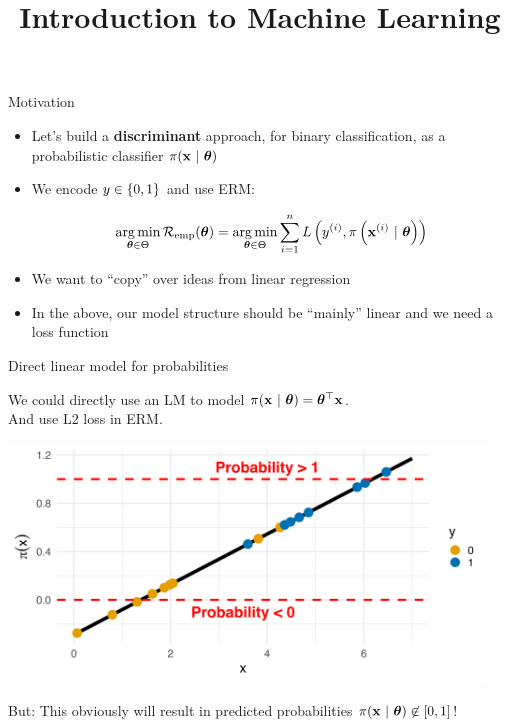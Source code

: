 \documentclass[11pt,compress,t,notes=noshow, xcolor=table]{beamer}
\title{Introduction to Machine Learning}
\begin{document}

\framebreak


\begin{vbframe}{Motivation}

\begin{itemize}

\item Let's build a \textbf{discriminant} approach, for binary classification, as a probabilistic classifier $\pi(\mathbf{x}~|~ \bm{\theta})$

\item We encode $y \in \{0, 1\}$ and use ERM:
  
$$ \mathop{\mathrm{arg\,min}}_{\bm{\theta} \in \Theta} \mathcal{R}_{\text{emp}}(\bm{\theta}) = \mathop{\mathrm{arg\,min}}_{\bm{\theta} \in \Theta} \sum\limits_{i=1}^n L\left(y^{(i)}, \pi\left(\mathbf{x}^{(i)} ~|~ \bm{\theta}\right)\right)$$

\item We want to \enquote{copy} over ideas from linear regression

\item In the above, our model structure should be \enquote{mainly} linear and we need a loss function

\end{itemize}


\end{vbframe}

\begin{vbframe}{Direct linear model for probabilities}

We could directly use an LM to model $\pi(\mathbf{x}~|~ \bm{\theta}) = \bm{\theta}^\top \mathbf{x}$.\\
And use L2 loss in ERM.

\lz 

{\centering \includegraphics[width=0.95\textwidth]{figure/preds_with_probs-linear.png}
}

But: This obviously will result in predicted probabilities $\pi(\mathbf{x}~|~ \bm{\theta}) \not\in [0,1]$!

\end{vbframe}
\end{document}
